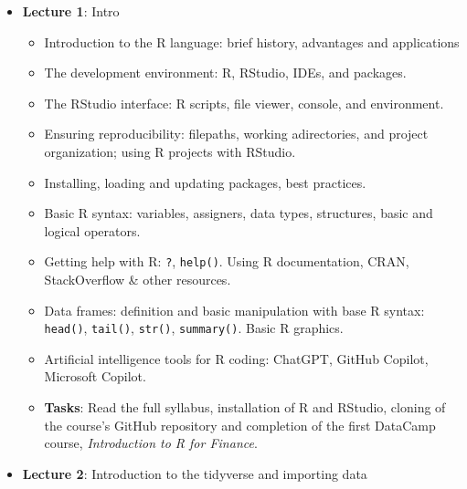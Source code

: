 \documentclass[
  letterpaper,
  DIV=11,
  numbers=noendperiod]{scrartcl}
\providecommand{\tightlist}{%
  \setlength{\itemsep}{0pt}\setlength{\parskip}{0pt}}\usepackage{longtable,booktabs,array}
\begin{document}
\begin{itemize}
\tightlist
\item
  \textbf{Lecture 1}: Intro

  \begin{itemize}
  \tightlist
  \item
    Introduction to the R language: brief history, advantages and
    applications
  \item
    The development environment: R, RStudio, IDEs, and packages.
  \item
    The RStudio interface: R scripts, file viewer, console, and
    environment.
  \item
    Ensuring reproducibility: filepaths, working adirectories, and
    project organization; using R projects with RStudio.
  \item
    Installing, loading and updating packages, best practices.
  \item
    Basic R syntax: variables, assigners, data types, structures, basic
    and logical operators.
  \item
    Getting help with R: \texttt{?}, \texttt{help()}. Using R
    documentation, CRAN, StackOverflow \& other resources.
  \item
    Data frames: definition and basic manipulation with base R syntax:
    \texttt{head()}, \texttt{tail()}, \texttt{str()},
    \texttt{summary()}. Basic R graphics.
  \item
    Artificial intelligence tools for R coding: ChatGPT, GitHub Copilot,
    Microsoft Copilot.
  \item
    \textbf{Tasks}: Read the full syllabus, installation of R and
    RStudio, cloning of the course's GitHub repository and completion of
    the first DataCamp course, \emph{Introduction to R for Finance}.
  \end{itemize}
\item
  \textbf{Lecture 2}: Introduction to the tidyverse and importing data


\end{itemize}
\end{document}
